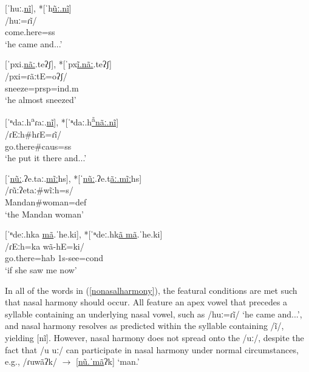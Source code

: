 \begin{exe}
\begin{xlist}
	\item\label{nonasalharmony6}
	\glll \textnormal{[ˈhuː.\uline{nĩ}], *[ˈh\uline{ũː.nĩ}]}\\
	/huː=ɾĩ/\\
	\textnormal{come.here}=ss\\
	\glt `he came and...' \citep[230]{hollow1973b}

	\item\label{nonasalharmony7}
	\glll \textnormal{[ˈpxi.\uline{nãː}.teʔʃ], *[ˈpx\uline{ĩ.nãː}.teʔʃ]}\\
	/pxi=ɾãːtE=oʔʃ/\\
	\textnormal{sneeze}={prsp=ind.m}\\
	\glt `he almost sneezed' \citep[468]{hollow1970}

	\item\label{nonasalharmony8}
	\glll \textnormal{[ˈⁿdaː.h\textsuperscript{a}ɾaː.\uline{nĩ}], *[ˈⁿdaː.h\uline{\textsuperscript{ã}nãː.nĩ}]}\\
	/ɾEːh\#hɾE=ɾĩ/\\
	\textnormal{go.there}\#{caus=ss}\\
	\glt  `he put it there and...' \citep[26]{hollow1973a}

	\item\label{nonasalharmony9}
	\glll \textnormal{[ˈ\uline{nũː}.ʔe.taː.\uline{mĩː}hs], *[ˈ\uline{nũː}.ʔe.t\uline{ãː.mĩː}hs]}\\
	/ɾũːʔetaː\#wĩːh=s/\\
	\textnormal{Mandan}\#\textnormal{woman}={def}\\
	\glt `the Mandan woman' \citep[87]{hollow1973b}

	\item\label{nonasalharmony10}
	\glll \textnormal{[ˈⁿdeː.hka} \textnormal{\uline{mã}.ˈhe.ki], *[ˈⁿdeː.hk\uline{ã mã}.ˈhe.ki]}\\
	/ɾEːh=ka wã-hE=ki/\\
	\textnormal{go.there}=hab {1s}-\textnormal{see}={cond}\\
	\glt `if she saw me now' \citep[21]{hollow1973a}
	\end{xlist}
\end{exe}

In all of the words in (\ref{nonasalharmony}), the featural conditions are met such that nasal harmony should occur. All feature an apex vowel that precedes a syllable containing an underlying nasal vowel, such as /huː=ɾĩ/ `he came and...', and nasal harmony resolves as predicted within the syllable containing /ĩ/, yielding [nĩ]. However, nasal harmony does not spread onto the /uː/, despite the fact that /u uː/ can participate in nasal harmony under normal circumstances, e.g., /ɾuwãʔk/ $\to$ [\uline{nũ.ˈmã}ʔk] `man.'


